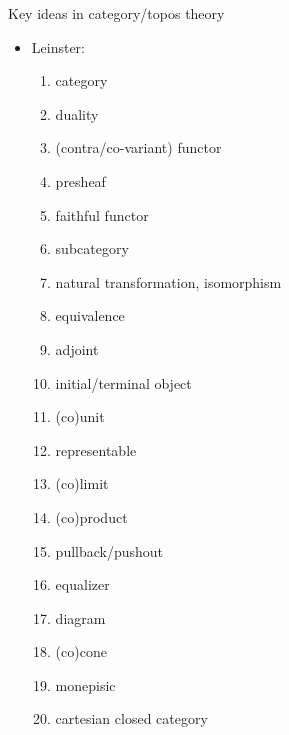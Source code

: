\begin{plSection}{Key ideas in category/topos theory}
\begin{itemize}
\begin{enumerate}
\end{enumerate}

\item Leinster:~\cite{Leinster:2016:BasicCategoryTheory}
\begin{enumerate}
  \item category
  \item duality
  \item (contra/co-variant) functor
  \item presheaf
  \item faithful functor
  \item subcategory
  \item natural transformation, isomorphism
  \item equivalence
  \item adjoint
  \item initial/terminal object
  \item (co)unit
  \item representable
  \item (co)limit
  \item (co)product
  \item pullback/pushout
  \item equalizer
  \item diagram
  \item (co)cone
  \item monepisic
  \item cartesian closed category
\end{enumerate}


\end{itemize}
\end{plSection}
